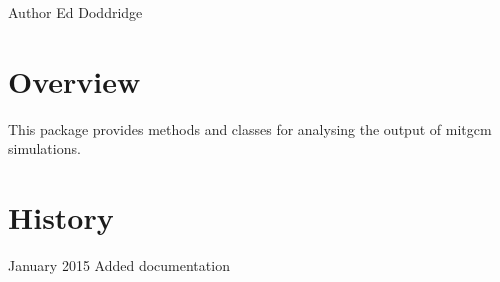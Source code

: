 \begin{DoxyAuthor}{Author}
Ed Doddridge
\end{DoxyAuthor}
\hypertarget{index_Overview}{}\section{Overview}\label{index_Overview}
This package provides methods and classes for analysing the output of mitgcm simulations.\hypertarget{index_Revision}{}\section{History}\label{index_Revision}
January 2015 Added documentation 